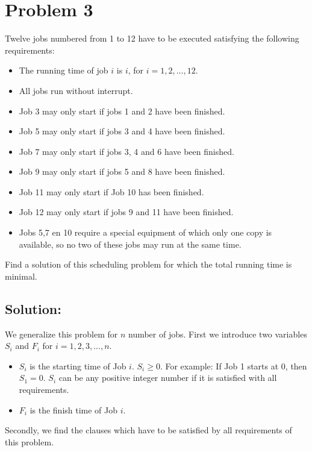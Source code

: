\section*{Problem 3}

Twelve jobs numbered from 1 to 12 have to be executed satisfying the following requirements:
\begin{itemize}
  \item The running time of job $i$ is $i$, for $i = 1, 2, . . . , 12$.
  \item All jobs run without interrupt.
  \item Job 3 may only start if jobs 1 and 2 have been finished.
  \item Job 5 may only start if jobs 3 and 4 have been finished.
  \item Job 7 may only start if jobs 3, 4 and 6 have been finished.
  \item Job 9 may only start if jobs 5 and 8 have been finished.
  \item Job 11 may only start if Job 10 has been finished.
  \item Job 12 may only start if jobs 9 and 11 have been finished.
  \item Jobs 5,7 en 10 require a special equipment of which only one copy is available, so no two of these jobs may run at the same time.
\end{itemize}
Find a solution of this scheduling problem for which the total running time is minimal.

\vspace{4mm}

\subsection*{Solution:}
We generalize this problem for $n$ number of jobs. First we introduce two variables $S_{i}$ and $F_{i}$ for $i = 1,2,3,...,n$.
\begin{itemize}
  \item $S_{i}$ is the starting time of Job $i$. $S_{i} \geq 0$. For example: If Job 1 starts at 0, then $S_{1} = 0$. $S_{i}$ can be any positive integer number if it is satisfied with all requirements.
  \item $F_{i}$ is the finish time of Job $i$.
\end{itemize}

Secondly, we find the clauses which have to be satisfied by all requirements of this problem.


